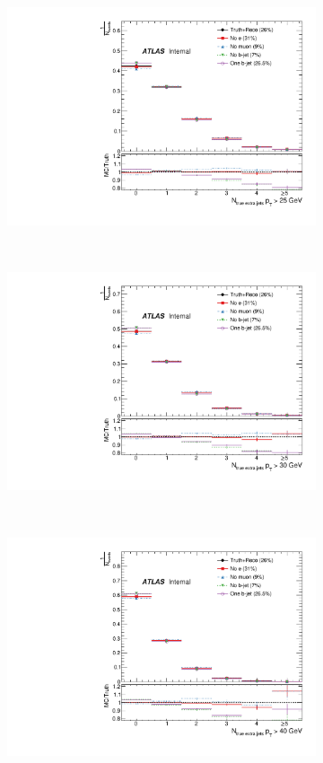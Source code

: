 \begin{figure}
\centering
\begin{subfigure}[]{0.45\textwidth}
\includegraphics[width=\textwidth]{fig/TruthNotReco/NTruthExtraJets25.pdf}
\end{subfigure}
~
\begin{subfigure}[]{0.45\textwidth}
\includegraphics[width=\textwidth]{fig/TruthNotReco/NTruthExtraJets30.pdf}
\end{subfigure}
~
\begin{subfigure}[]{0.45\textwidth}
\includegraphics[width=\textwidth]{fig/TruthNotReco/NTruthExtraJets40.pdf}

\end{subfigure}
\end{figure}
